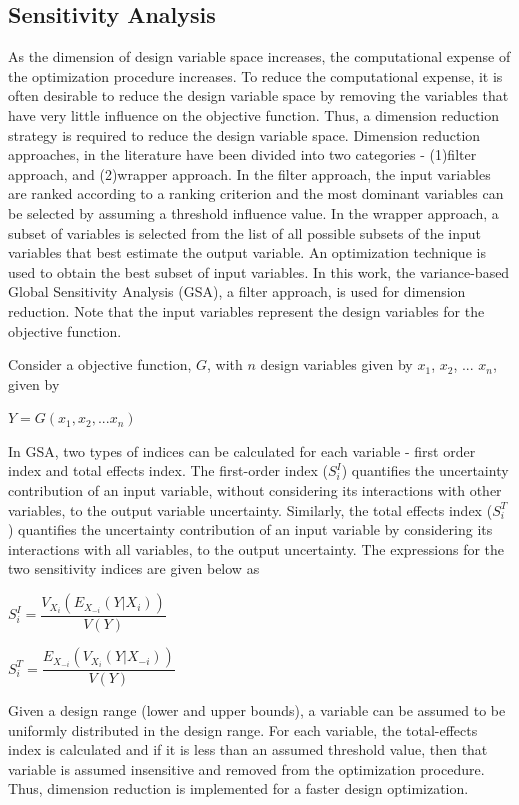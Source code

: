 \documentclass[11pt]{article}
\begin{document}
\subsection{Sensitivity Analysis}
\hspace{5 mm} As the dimension of design variable space increases, the computational expense of the optimization procedure increases. To reduce the computational expense, it is often desirable to reduce the design variable space by removing the variables that have very little influence on the objective function. Thus, a dimension reduction strategy is required to reduce the design variable space. Dimension reduction approaches, in the literature have been divided into two categories - (1)filter approach, and (2)wrapper approach. In the filter approach, the input variables are ranked according to a ranking criterion and the most dominant variables can be selected by assuming a threshold influence value. In the wrapper approach, a subset of variables is selected from the list of all possible subsets of the input variables that best estimate the output variable. An optimization technique is used to obtain the best subset of input variables. In this work, the variance-based Global Sensitivity Analysis (GSA), a filter approach, is used for dimension reduction. Note that the input variables represent the design variables for the objective function.

\hspace{5 mm} Consider a objective function, $G$, with $n$ design variables given by $x_{1}$, $x_{2}$, ...  $x_{n}$, given by

\centerline{$Y = G(x_{1}, x_{2}, ... x_{n})$}

In GSA, two types of indices can be calculated for each variable - first order index and total effects index. The first-order index ($S_{i}^{I}$) quantifies the uncertainty contribution of an input variable, without considering its interactions with other variables, to the output variable uncertainty. Similarly, the total effects index ($S_{i}^{T}$) quantifies the uncertainty contribution of an input variable by considering its interactions with all variables, to the output uncertainty. The expressions for the two sensitivity indices are given below as 

\centerline{$S_{i}^{I} = \dfrac{V_{X_i}(E_{X_{-i}}(Y|X_{i}))}{V(Y)}$}
\centerline{$S_{i}^{T} = \dfrac{E_{X_{-i}}(V_{X_{i}}(Y|X_{-i}))}{V(Y)}$}

Given a design range (lower and upper bounds), a variable can be assumed to be uniformly distributed in the design range. For each variable, the total-effects index is calculated and if it is less than an assumed threshold value, then that variable is assumed insensitive and removed from the optimization procedure. Thus, dimension reduction is implemented for a faster design optimization. 
\end{document}
